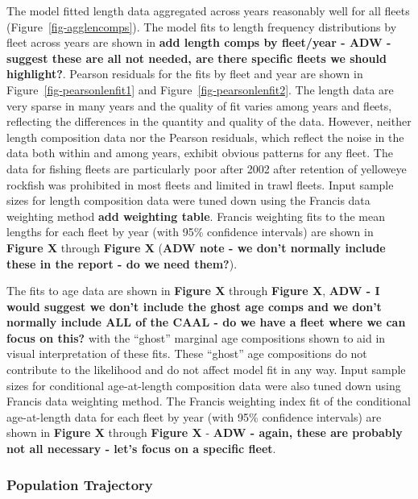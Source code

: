 \documentclass[
]{scrartcl}
\begin{document}
The model fitted length data aggregated across years reasonably well for
all fleets (Figure~\ref{fig-agglencomps}). The model fits to length
frequency distributions by fleet across years are shown in \textbf{add
length comps by fleet/year - ADW - suggest these are all not needed, are
there specific fleets we should highlight?}. Pearson residuals for the
fits by fleet and year are shown in Figure~\ref{fig-pearsonlenfit1} and
Figure~\ref{fig-pearsonlenfit2}. The length data are very sparse in many
years and the quality of fit varies among years and fleets, reflecting
the differences in the quantity and quality of the data. However,
neither length composition data nor the Pearson residuals, which reflect
the noise in the data both within and among years, exhibit obvious
patterns for any fleet. The data for fishing fleets are particularly
poor after 2002 after retention of yelloweye rockfish was prohibited in
most fleets and limited in trawl fleets. Input sample sizes for length
composition data were tuned down using the Francis data weighting method
\textbf{add weighting table}. Francis weighting fits to the mean lengths
for each fleet by year (with 95\% confidence intervals) are shown in
\textbf{Figure X} through \textbf{Figure X} (\textbf{ADW note - we don't
normally include these in the report - do we need them?}).

The fits to age data are shown in \textbf{Figure X} through
\textbf{Figure X}, \textbf{ADW - I would suggest we don't include the
ghost age comps and we don't normally include ALL of the CAAL - do we
have a fleet where we can focus on this?} with the ``ghost'' marginal
age compositions shown to aid in visual interpretation of these fits.
These ``ghost'' age compositions do not contribute to the likelihood and
do not affect model fit in any way. Input sample sizes for conditional
age-at-length composition data were also tuned down using Francis data
weighting method. The Francis weighting index fit of the conditional
age-at-length data for each fleet by year (with 95\% confidence
intervals) are shown in \textbf{Figure X} through \textbf{Figure X} -
\textbf{ADW - again, these are probably not all necessary - let's focus
on a specific fleet}.

\subsubsection{Population Trajectory}\label{population-trajectory}
\end{document}
